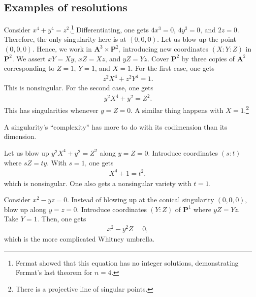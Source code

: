 \documentclass [11 pt, oneside] {article}
\begin{document}
\subsection{Examples of resolutions}
\begin{example}[ ]\label{}\text{}
Consider $x^4+y^4=z^2$.\footnote{Fermat showed that this equation has no integer solutions, demonstrating Fermat's last theorem for $n=4$.} Differentiating, one gets $4x^3=0$, $4y^3=0$, and $2z=0$. Therefore, the only singularity here is at $(0,0,0)$. Let us blow up the point $(0,0,0)$. Hence, we work in $\mathbf{A}^3\times \mathbf{P}^2$, introducing new coordinates $(X:Y:Z)$ in $\mathbf{P}^2$. We assert $xY=Xy$, $xZ=Xz$, and $yZ=Yz$. Cover $\mathbf{P}^2$ by three copies of $\mathbf{A}^2$ corresponding to $Z=1$, $Y=1$, and $X=1$. For the first case, one gets 
\begin{align*}
	z^2X^4+z^2Y^4=1.
\end{align*}
This is nonsingular. For the second case, one gets
\begin{align*}
	y^2X^4+y^2=Z^2.
\end{align*}
This has singularities whenever $y=Z=0$. A similar thing happens with $X=1$.\footnote{There is a projective line of singular points.}

\begin{remark}
	A singularity's ``complexity'' has more to do with its codimension than its dimension.
\end{remark}

Let us blow up $y^2X^4+y^2=Z^2$ along $y=Z=0$. Introduce coordinates $(s:t)$ where $sZ=ty$. With $s=1$, one gets 
\begin{align*}
	X^4 + 1=t^2,
\end{align*}
which is nonsingular. One also gets a nonsingular variety with $t=1$.
\end{example}


\begin{example}\label{}\text{}
Consider $x^2-yz=0$. Instead of blowing up at the conical singularity $(0,0,0)$, blow up along $y=z=0$. Introduce coordinates $(Y:Z)$ of $\mathbf{P}^1$ where $yZ=Yz$. Take $Y=1$. Then, one gets
\begin{align*}
	x^2-y^2Z=0,
\end{align*}
which is the more complicated Whitney umbrella.
\end{example}
\end{document}
